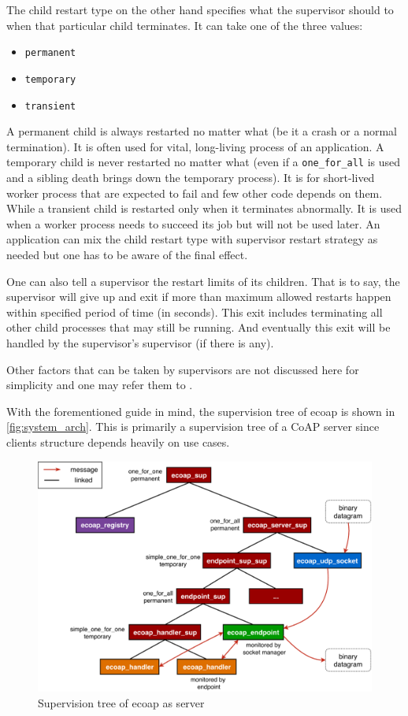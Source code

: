 The child restart type on the other hand specifies what the supervisor should to when that particular child terminates. It can take one of the three values:

\begin{itemize}

\item \verb|permanent|
\item \verb|temporary|
\item \verb|transient|

\end{itemize}

A permanent child is always restarted no matter what (be it a crash or a normal termination). It is often used for vital, long-living process of an application. A temporary child is never restarted no matter what (even if a \verb|one_for_all| is used and a sibling death brings down the temporary process). It is for short-lived worker process that are expected to fail and few other code depends on them. While a transient child is restarted only when it terminates abnormally. It is used when a worker process needs to succeed its job but will not be used later. An application can mix the child restart type with supervisor restart strategy as needed but one has to be aware of the final effect. 

One can also tell a supervisor the restart limits of its children. That is to say, the supervisor will give up and exit if more than maximum allowed restarts happen within specified period of time (in seconds). This exit includes terminating all other child processes that may still be running. And eventually this exit will be handled by the supervisor's supervisor (if there is any).

Other factors that can be taken by supervisors are not discussed here for simplicity and one may refer them to \autocite{otp_supervisor}.

With the forementioned guide in mind, the supervision tree of ecoap is shown in \autoref{fig:system_arch}. This is primarily a supervision tree of a CoAP server since clients structure depends heavily on use cases. 

\begin{figure}[!htbp]
\centering
\includegraphics[scale = 0.7]{system_arch_vertical}
\caption{Supervision tree of ecoap as server}
\label{fig:system_arch}
\end{figure}

